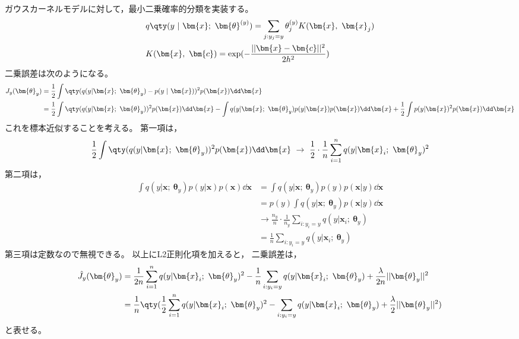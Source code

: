 \documentclass[class=jsarticle, crop=false, dvipdfmx, fleqn]{standalone}
\begin{document}
\section{}

ガウスカーネルモデルに対して，最小二乗確率的分類を実装する。
\begin{align}
    & q\qty(y\ |\ \bm{x};\ \bm{\theta}^{(y)})
        = \sum_{j:y_j = y} \theta_j^{(y)} K(\bm{x},\ \bm{x}_j) \\
    & K(\bm{x},\ \bm{c}) = \exp(- \frac{||\bm{x} - \bm{c}||^2}{2 h^2})
\end{align}
二乗誤差は次のようになる。
\begin{align}
    J_y (\bm{\theta}_y)
        & = \frac{1}{2} \int \qty(q(y|\bm{x};\ \bm{\theta}_y) - p(y\ |\ \bm{x}))^2 p(\bm{x}) \dd\bm{x} \\
        & =
            \frac{1}{2} \int \qty(q(y|\bm{x};\ \bm{\theta}_y))^2 p(\bm{x}) \dd\bm{x}
            - \int q(y|\bm{x};\ \bm{\theta}_y) p(y|\bm{x}) p(\bm{x}) \dd\bm{x}
            + \frac{1}{2} \int p(y|\bm{x})^2 p(\bm{x}) \dd\bm{x}
\end{align}
これを標本近似することを考える。
第一項は，
\begin{equation}
    \frac{1}{2} \int \qty(q(y|\bm{x};\ \bm{\theta}_y))^2 p(\bm{x}) \dd\bm{x}
        \ \rightarrow\ 
        \frac{1}{2} \cdot \frac{1}{n} \sum_{i=1}^{n} q(y|\bm{x}_i;\ \bm{\theta}_y)^2
\end{equation}
第二項は，
\begin{align}
    \int q(y|\bm{x};\ \bm{\theta}_y) p(y|\bm{x}) p(\bm{x}) \dd\bm{x}
        & = \int q(y|\bm{x};\ \bm{\theta}_y) p(y) p(\bm{x}|y) \dd\bm{x} \\
        & = p(y) \int q(y|\bm{x};\ \bm{\theta}_y) p(\bm{x}|y) \dd\bm{x} \\
        & \rightarrow \frac{n_y}{n} \cdot \frac{1}{n_y} \sum_{i:y_i=y} q(y|\bm{x}_i;\ \bm{\theta}_y) \\
        & = \frac{1}{n} \sum_{i:y_i=y} q(y|\bm{x}_i;\ \bm{\theta}_y)
\end{align}
第三項は定数なので無視できる。
以上にL2正則化項を加えると，
二乗誤差は，
\begin{align}
    \hat{J}_y (\bm{\theta}_y)
        & =
            \frac{1}{2n} \sum_{i=1}^{n} q(y|\bm{x}_i;\ \bm{\theta}_y)^2
            - \frac{1}{n} \sum_{i:y_i=y} q(y|\bm{x}_i;\ \bm{\theta}_y)
            + \frac{\lambda}{2n} ||\bm{\theta}_y||^2 \\
        & = \frac{1}{n} \qty(
            \frac{1}{2} \sum_{i=1}^{n} q(y|\bm{x}_i;\ \bm{\theta}_y)^2
            - \sum_{i:y_i=y} q(y|\bm{x}_i;\ \bm{\theta}_y)
            + \frac{\lambda}{2} ||\bm{\theta}_y||^2
            )
\end{align}
と表せる。
\end{document}
